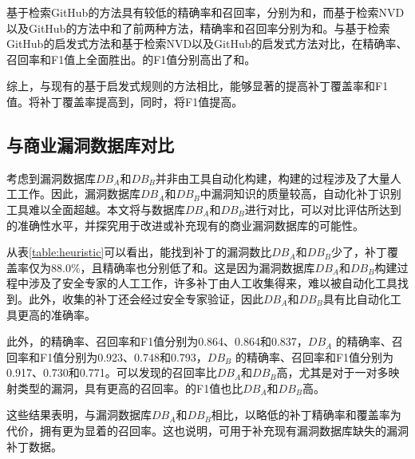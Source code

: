 基于检索GitHub的方法具有较低的精确率和召回率，分别为和，而基于检索NVD以及GitHub的方法中和了前两种方法，精确率和召回率分别为和。与基于检索GitHub的启发式方法和基于检索NVD以及GitHub的启发式方法对比，\tool 在精确率、召回率和F1值上全面胜出。\tool 的F1值分别高出了和。

综上，与现有的基于启发式规则的方法相比，\tool 能够显著的提高补丁覆盖率和F1值。\tool 将补丁覆盖率提高到，同时，将F1值提高。


\subsection{与商业漏洞数据库对比}

考虑到漏洞数据库$DB_A$和$DB_B$并非由工具自动化构建，构建的过程涉及了大量人工工作。因此，漏洞数据库$DB_A$和$DB_B$中漏洞知识的质量较高，自动化补丁识别工具难以全面超越。本文将\tool 与数据库$DB_A$和$DB_B$进行对比，可以对比评估\tool 所达到的准确性水平，并探究\tool 用于改进或补充现有的商业漏洞数据库的可能性。%

从表\ref{table:heuristic}可以看出，\tool 能找到补丁的漏洞数比$DB_A$和$DB_B$少了，补丁覆盖率仅为88.0\%，且精确率也分别低了和。这是因为漏洞数据库$DB_A$和$DB_B$构建过程中涉及了安全专家的人工工作，许多补丁由人工收集得来，难以被自动化工具找到。此外，收集的补丁还会经过安全专家验证，因此$DB_A$和$DB_B$具有比自动化工具更高的准确率。

此外，\tool 的精确率、召回率和F1值分别为0.864、0.864和0.837，$DB_A$ 的精确率、召回率和F1值分别为0.923、0.748和0.793，$DB_B$ 的精确率、召回率和F1值分别为0.917、0.730和0.771。可以发现\tool 的召回率比$DB_A$和$DB_B$高，尤其是对于一对多映射类型的漏洞，\tool 具有更高的召回率。\tool 的F1值也比$DB_A$和$DB_B$高。

这些结果表明，与漏洞数据库$DB_A$和$DB_B$相比，\tool 以略低的补丁精确率和覆盖率为代价，拥有更为显着的召回率。这也说明，\tool 可用于补充现有漏洞数据库缺失的漏洞补丁数据。

